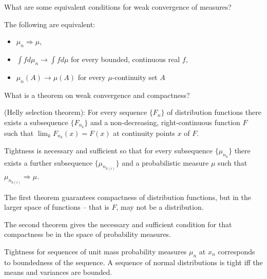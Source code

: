 \documentclass[avery5388,grid,frame]{flashcards}
\begin{document}
\begin{flashcard}
    {What are some equivalent conditions for weak convergence of measures?}
    \begin{theorem}
        The following are equivalent:
        \begin{itemize}
            \item $\mu_n \Rightarrow \mu$,
            \item $\int f d\mu_n \rightarrow \int f d\mu$ for every bounded, continuous real $f$,
            \item $\mu_n(A) \rightarrow \mu(A)$ for every $\mu$-continuity set $A$
        \end{itemize}
    \end{theorem}
\end{flashcard}


\begin{flashcard}
    {What is a theorem on weak convergence and compactness?}
    \begin{theorem}
        (Helly selection theorem): For every sequence $\{ F_n \}$ of distribution functions there exists a subsequence $\{ F_{n_k} \}$ and a non-decreasing, right-continuous function $F$ such that $\lim_k F_{n_k}(x) = F(x)$ at continuity points $x$ of $F$.
    \end{theorem}

    \begin{theorem}
        Tightness is necessary and sufficient so that for every subsequence $\{ \mu_{n_k} \}$ there exists a further subsequence $\{ \mu_{n_{k(i)}} \}$ and a probabilistic measure $\mu$ such that $\mu_{n_{k(i)}} \Rightarrow \mu$.
    \end{theorem}

    \begin{remark}
        The first theorem guarantees compactness of distribution functions, but in the larger space of functions -- that is $F$, may not be a distribution.

        The second theorem gives the necessary and sufficient condition for that compactness be in the space of probability measures.
    \end{remark}

    \begin{remark}
        Tightness for sequences of unit mass probability measures $\mu_n$ at $x_n$ corresponds to boundedness of the sequence. A sequence of normal distributions is tight iff the means and variances are bounded.
    \end{remark}
\end{flashcard}
\end{document}
